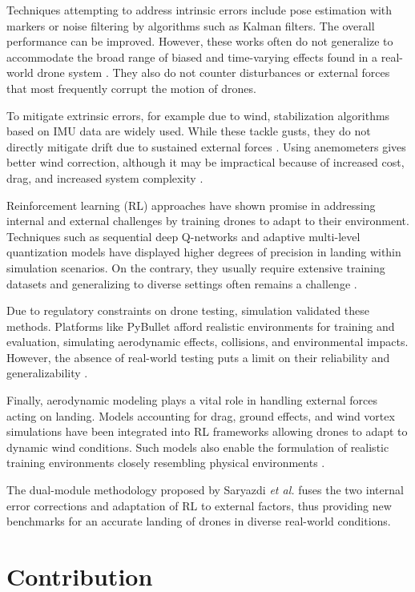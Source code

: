 \documentclass[10pt,journal,compsoc]{IEEEtran}
\begin{document}
Techniques attempting to address intrinsic errors include pose estimation with markers or noise filtering by algorithms such as Kalman filters. The overall performance can be improved. However, these works often do not generalize to accommodate the broad range of biased and time-varying effects found in a real-world drone system \cite{Zhong2020}. They also do not counter disturbances or external forces that most frequently corrupt the motion of drones.

To mitigate extrinsic errors, for example due to wind, stabilization algorithms based on IMU data are widely used. While these tackle gusts, they do not directly mitigate drift due to sustained external forces \cite{41}. Using anemometers gives better wind correction, although it may be impractical because of increased cost, drag, and increased system complexity \cite{Ramanathan2022}.

Reinforcement learning (RL) approaches have shown promise in addressing internal and external challenges by training drones to adapt to their environment. Techniques such as sequential deep Q-networks and adaptive multi-level quantization models have displayed higher degrees of precision in landing within simulation scenarios. On the contrary, they usually require extensive training datasets and generalizing to diverse settings often remains a challenge \cite{Kober2013, 44}.

Due to regulatory constraints on drone testing, simulation validated these methods. Platforms like PyBullet afford realistic environments for training and evaluation, simulating aerodynamic effects, collisions, and environmental impacts. However, the absence of real-world testing puts a limit on their reliability and generalizability \cite{Panerati}.

Finally, aerodynamic modeling plays a vital role in handling external forces acting on landing. Models accounting for drag, ground effects, and wind vortex simulations have been integrated into RL frameworks allowing drones to adapt to dynamic wind conditions. Such models also enable the formulation of realistic training environments closely resembling physical environments \cite{Forster}.

The dual-module methodology proposed by Saryazdi \textit{et al.} fuses the two internal error corrections and adaptation of RL to external factors, thus providing new benchmarks for an accurate landing of drones in diverse real-world conditions.

\section{Contribution}\label{sec:contribution}
 
\end{document}
